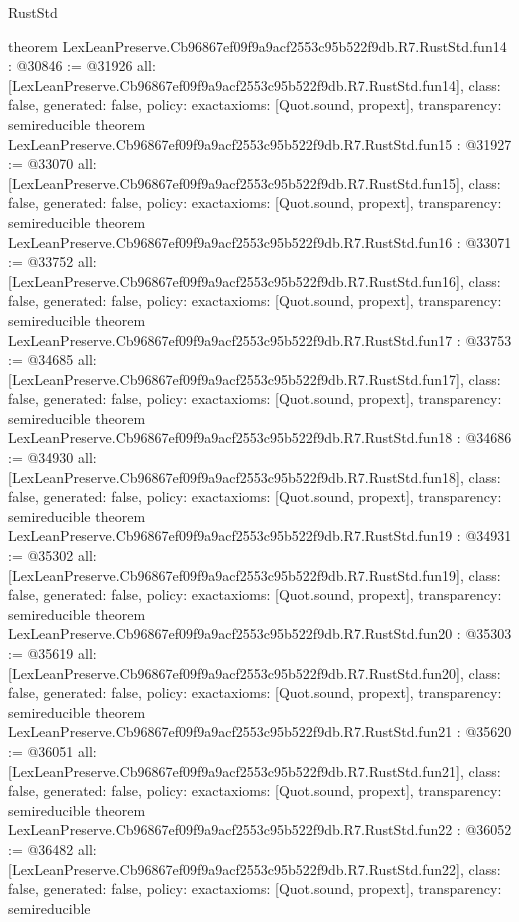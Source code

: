 \begin{lexlean}{RustStd}
\begin{coremodule}
{}
theorem LexLeanPreserve.Cb96867ef09f9a9acf2553c95b522f9db.R7.RustStd.fun14 : @30846 := @31926 {
  all: [LexLeanPreserve.Cb96867ef09f9a9acf2553c95b522f9db.R7.RustStd.fun14],
  class: false,
  generated: false,
  policy: exact{axioms: [Quot.sound, propext]},
  transparency: semireducible
}
theorem LexLeanPreserve.Cb96867ef09f9a9acf2553c95b522f9db.R7.RustStd.fun15 : @31927 := @33070 {
  all: [LexLeanPreserve.Cb96867ef09f9a9acf2553c95b522f9db.R7.RustStd.fun15],
  class: false,
  generated: false,
  policy: exact{axioms: [Quot.sound, propext]},
  transparency: semireducible
}
theorem LexLeanPreserve.Cb96867ef09f9a9acf2553c95b522f9db.R7.RustStd.fun16 : @33071 := @33752 {
  all: [LexLeanPreserve.Cb96867ef09f9a9acf2553c95b522f9db.R7.RustStd.fun16],
  class: false,
  generated: false,
  policy: exact{axioms: [Quot.sound, propext]},
  transparency: semireducible
}
theorem LexLeanPreserve.Cb96867ef09f9a9acf2553c95b522f9db.R7.RustStd.fun17 : @33753 := @34685 {
  all: [LexLeanPreserve.Cb96867ef09f9a9acf2553c95b522f9db.R7.RustStd.fun17],
  class: false,
  generated: false,
  policy: exact{axioms: [Quot.sound, propext]},
  transparency: semireducible
}
theorem LexLeanPreserve.Cb96867ef09f9a9acf2553c95b522f9db.R7.RustStd.fun18 : @34686 := @34930 {
  all: [LexLeanPreserve.Cb96867ef09f9a9acf2553c95b522f9db.R7.RustStd.fun18],
  class: false,
  generated: false,
  policy: exact{axioms: [Quot.sound, propext]},
  transparency: semireducible
}
theorem LexLeanPreserve.Cb96867ef09f9a9acf2553c95b522f9db.R7.RustStd.fun19 : @34931 := @35302 {
  all: [LexLeanPreserve.Cb96867ef09f9a9acf2553c95b522f9db.R7.RustStd.fun19],
  class: false,
  generated: false,
  policy: exact{axioms: [Quot.sound, propext]},
  transparency: semireducible
}
theorem LexLeanPreserve.Cb96867ef09f9a9acf2553c95b522f9db.R7.RustStd.fun20 : @35303 := @35619 {
  all: [LexLeanPreserve.Cb96867ef09f9a9acf2553c95b522f9db.R7.RustStd.fun20],
  class: false,
  generated: false,
  policy: exact{axioms: [Quot.sound, propext]},
  transparency: semireducible
}
theorem LexLeanPreserve.Cb96867ef09f9a9acf2553c95b522f9db.R7.RustStd.fun21 : @35620 := @36051 {
  all: [LexLeanPreserve.Cb96867ef09f9a9acf2553c95b522f9db.R7.RustStd.fun21],
  class: false,
  generated: false,
  policy: exact{axioms: [Quot.sound, propext]},
  transparency: semireducible
}
theorem LexLeanPreserve.Cb96867ef09f9a9acf2553c95b522f9db.R7.RustStd.fun22 : @36052 := @36482 {
  all: [LexLeanPreserve.Cb96867ef09f9a9acf2553c95b522f9db.R7.RustStd.fun22],
  class: false,
  generated: false,
  policy: exact{axioms: [Quot.sound, propext]},
  transparency: semireducible
}
\end{coremodule}
\end{lexlean}
